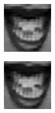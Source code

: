 \begin{figure}
\begin{subfigure}[b]{0.15\textwidth}
		\caption{}
		\label{fig:timeseriesHappy:h}
	\end{subfigure}
	\begin{subfigure}[b]{0.15\textwidth}
		\includegraphics[width=\textwidth]{./img/timeseriesHappy/S026_006_00000009.png}
		\caption{}
		\label{fig:timeseriesHappy:i}
	\end{subfigure}
	\begin{subfigure}[b]{0.15\textwidth}
		\includegraphics[width=\textwidth]{./img/timeseriesHappy/S026_006_00000010.png}

\end{subfigure}
\end{figure}
